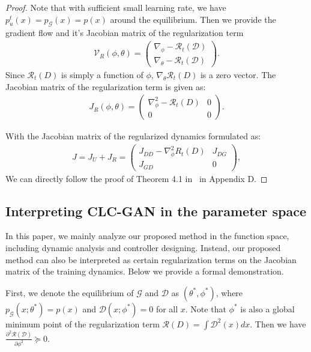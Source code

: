 \documentclass{article}
\newcommand{\xG}{\mathcal{G}}
\newcommand{\xD}{\mathcal{D}}
\newcommand{\uV}{\mathcal{V}}
\newcommand{\uR}{\mathcal{R}}
\theoremstyle{definition}
\begin{document}
\begin{proof}
	Note that with sufficient small learning rate, we have $p_u^t(x) = p_\xG(x) = p(x)$ around the equilibrium. Then we provide the gradient flow and it's Jacobian matrix of the regularization term 
	\begin{align}
	\uV_R(\phi, \theta) = \begin{pmatrix}
	\nabla_\phi -\uR_t(\xD) \\
	\nabla_\theta -\uR_t(\xD)
	\end{pmatrix}.
	\end{align}
	Since $\uR_t(D)$ is simply a function of $\phi$, $\nabla_\theta \uR_t(D)$ is a zero vector. The Jacobian matrix of the regularization term is given as:
	\begin{align}
	J_R(\phi, \theta) = \begin{pmatrix}
	\nabla^2_{\phi} -\uR_t(D)  & 0 \\
	0 & 0
	\end{pmatrix}.
	\end{align}
	
	With the Jacobian matrix of the regularized dynamics formulated as:
	\begin{align}
	J = J_U + J_R = \begin{pmatrix}
	J_{DD} - \nabla^2_{\phi} R_t(D) & J_{DG} \\
	J_{GD} & 0
	\end{pmatrix},
	\end{align}
	We can directly follow the proof of Theorem 4.1 in~\citet{mescheder2018training} in Appendix D.
\end{proof}



\subsection{Interpreting CLC-GAN in the parameter space}
In this paper, we mainly analyze our proposed method in the function space, including dynamic analysis and controller designing. Instead, our proposed method can also be interpreted as certain regularization terms on the Jacobian matrix of the training dynamics. Below we provide a formal demonstration.

First, we denote the equilibrium of $\xG$ and $\xD$ as $(\theta^*, \phi^*)$, where $p_\xG(x;\theta^*) = p(x)$ and $\xD(x; \phi^*) = 0$ for all $x$. Note that $\phi^*$ is also a global minimum point of the regularization term $\uR(D)=\int \xD^2(x) dx$. Then we have $\frac{\partial^2 \uR(\xD)}{\partial\phi^2}\succeq 0$.
\end{document}
